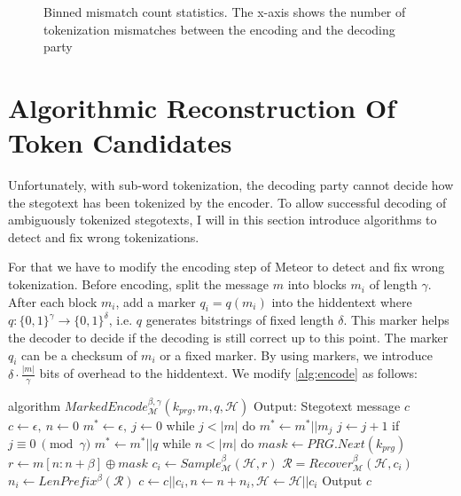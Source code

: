 \begin{figure}[htbp]
	\centering
	
	\caption{Binned mismatch count statistics. The x-axis shows the number of tokenization mismatches between the encoding and the decoding party}
	\label{fig:meteor-stats-mismatch-count}
\end{figure}



\section{Algorithmic Reconstruction Of Token Candidates}
\label{sec:alg-rec-tok-candidates}

Unfortunately, with sub-word tokenization, the decoding party cannot decide how the stegotext has been tokenized by the encoder.
To allow successful decoding of ambiguously tokenized stegotexts, I will in this section introduce algorithms to detect and fix wrong tokenizations. 


For that we have to modify the encoding step of Meteor to detect and fix wrong tokenization.
Before encoding, split the message $m$ into blocks $m_i$ of length $\gamma$.
After each block $m_i$, add a marker $q_i = q(m_i)$ into the hiddentext where $q \colon \{ 0,1 \}^\gamma \rightarrow \{ 0,1 \}^\delta$, i.e. $q$ generates bitstrings of fixed length $\delta$.
This marker helps the decoder to decide if the decoding is still correct up to this point.
The marker $q_i$ can be a checksum of $m_i$ or a fixed marker.
By using markers, we introduce $\delta \cdot \frac{|m|}{\gamma}$ bits of overhead to the hiddentext.
We modify \autoref{alg:encode} as follows:

\begin{Pseudocode}[caption={Marked Encode Algorithm}, label={alg:marked-encode}]
algorithm $MarkedEncode_{\mathcal{M}}^{\beta, \gamma}(k_{prg}, m, q, \mathcal{H})$
	Output: Stegotext message $c$
	$c \leftarrow \epsilon,~ n \leftarrow 0$
	$m^* \leftarrow \epsilon,~ j \leftarrow 0$
	while $j < |m|$ do
		$m^* \leftarrow m^* || m_j$
		$j \leftarrow j + 1$
		if $j \equiv 0~ \pmod \gamma$
			$m^* \leftarrow m^* || q$
	while $n < |m|$ do
		$mask \leftarrow PRG.Next(k_{prg})$
		$r \leftarrow m[n:n+\beta] \oplus mask$
		$c_i \leftarrow Sample_{\mathcal{M}}^\beta(\mathcal{H}, r)$
		$\mathcal{R} = Recover_{\mathcal{M}}^\beta(\mathcal{H}, c_i)$
		$n_i \leftarrow LenPrefix^\beta(\mathcal{R})$
		$c \leftarrow c || c_i, n \leftarrow n+n_i, \mathcal{H} \leftarrow \mathcal{H}||c_i$
	Output $c$
\end{Pseudocode}

